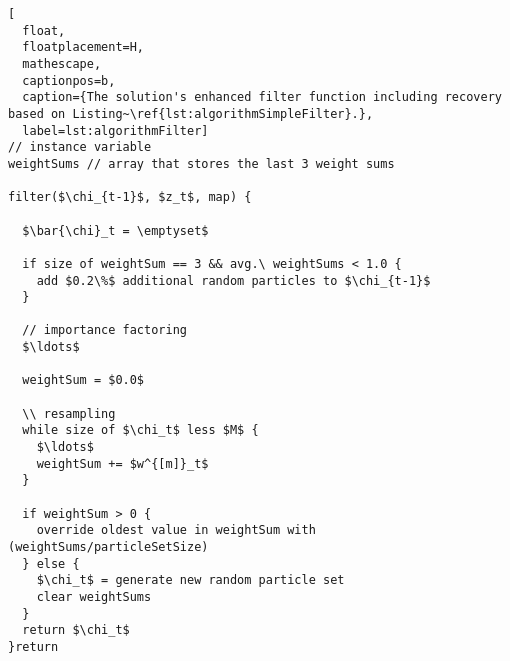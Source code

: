 \begin{lstlisting}[
  float,
  floatplacement=H,
  mathescape,
  captionpos=b,
  caption={The solution's enhanced filter function including recovery based on Listing~\ref{lst:algorithmSimpleFilter}.},
  label=lst:algorithmFilter]
// instance variable
weightSums // array that stores the last 3 weight sums

filter($\chi_{t-1}$, $z_t$, map) {

  $\bar{\chi}_t = \emptyset$

  if size of weightSum == 3 && avg.\ weightSums < 1.0 {
    add $0.2\%$ additional random particles to $\chi_{t-1}$
  }

  // importance factoring
  $\ldots$

  weightSum = $0.0$

  \\ resampling
  while size of $\chi_t$ less $M$ {
    $\ldots$
    weightSum += $w^{[m]}_t$
  }

  if weightSum > 0 {
    override oldest value in weightSum with (weightSums/particleSetSize)
  } else {
    $\chi_t$ = generate new random particle set
    clear weightSums
  }
  return $\chi_t$
}return\end{lstlisting}
